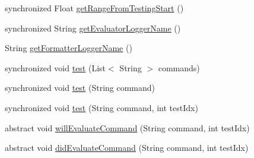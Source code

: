 \begin{DoxyCompactItemize}
synchronized Float \hyperlink{classit_1_1emarolab_1_1cagg_1_1core_1_1evaluation_1_1interfacing_1_1GrammarTesterBase_a9706e0c37b4c4cd70c2cd41d1bc03c6f}{get\-Range\-From\-Testing\-Start} ()
\item 
synchronized String \hyperlink{classit_1_1emarolab_1_1cagg_1_1core_1_1evaluation_1_1interfacing_1_1GrammarTesterBase_a477e0d6989bfd72dce81ea63d7f7cc8e}{get\-Evaluator\-Logger\-Name} ()
\item 
String \hyperlink{classit_1_1emarolab_1_1cagg_1_1core_1_1evaluation_1_1interfacing_1_1GrammarTesterBase_a2bfac15dc09847b97cc870259b69f388}{get\-Formatter\-Logger\-Name} ()
\item 
synchronized void \hyperlink{classit_1_1emarolab_1_1cagg_1_1core_1_1evaluation_1_1interfacing_1_1GrammarTesterBase_a562b5cba23866e1efaf291e2cfe77789}{test} (List$<$ String $>$ commands)
\item 
synchronized void \hyperlink{classit_1_1emarolab_1_1cagg_1_1core_1_1evaluation_1_1interfacing_1_1GrammarTesterBase_a4c566d0d671b247fe6edc0e364318804}{test} (String command)
\item 
synchronized void \hyperlink{classit_1_1emarolab_1_1cagg_1_1core_1_1evaluation_1_1interfacing_1_1GrammarTesterBase_a043376b632744ee12b75285a99aa3a98}{test} (String command, int test\-Idx)
\item 
abstract void \hyperlink{classit_1_1emarolab_1_1cagg_1_1core_1_1evaluation_1_1interfacing_1_1GrammarTesterBase_af010efc5cc218629439e6fa2586b4382}{will\-Evaluate\-Command} (String command, int test\-Idx)
\item 
abstract void \hyperlink{classit_1_1emarolab_1_1cagg_1_1core_1_1evaluation_1_1interfacing_1_1GrammarTesterBase_ac9370698c8aebe4e44f8302115dc1f00}{did\-Evaluate\-Command} (String command, int test\-Idx)
\end{DoxyCompactItemize}

